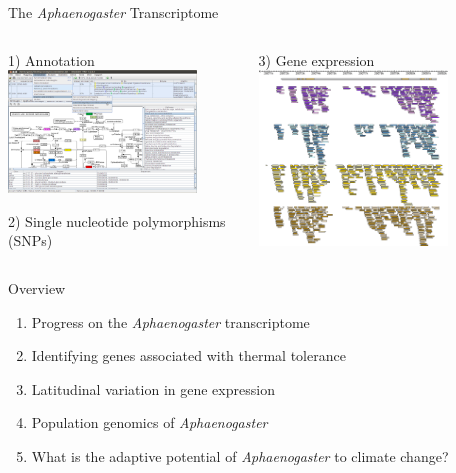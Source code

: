 \documentclass{beamer}
\begin{document}
\begin{frame}{The \textit{Aphaenogaster }Transcriptome}
	\begin{columns}
		\begin{column}{5cm}
			1) Annotation
			\vspace{.5cm}
			\includegraphics[width=5cm]{BLAST2GO_kegg.png}			

			2) Single nucleotide polymorphisms (SNPs) 		
		\end{column}
		\begin{column}{5cm}
			3) Gene expression
			\vspace{.5cm}
			\includegraphics[width=5cm]{rna_seq_bg.png}
		\end{column}
	\end{columns}
\end{frame}


\begin{frame}{Overview}
	\begin{enumerate}
  		\item Progress on the \textit{Aphaenogaster} transcriptome
	  	\item<1-| alert@1> Identifying genes associated with thermal tolerance
		\item Latitudinal variation in gene expression
  		\item Population genomics of \textit{Aphaenogaster}
  		\item What is the adaptive potential of \textit{Aphaenogaster} to climate change?
	\end{enumerate}
\end{frame}
\end{document}

